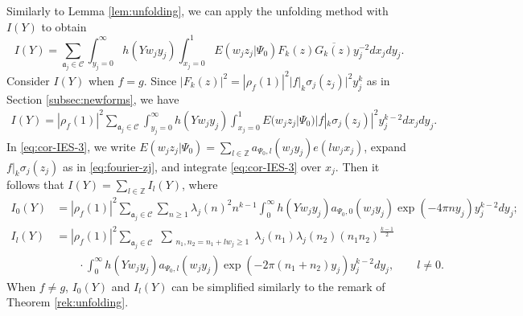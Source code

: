 \documentclass[12pt,reqno]{amsart}
\theoremstyle{remark}
\numberwithin{equation}{section}
\begin{document}
        Similarly to Lemma \ref{lem:unfolding}, we can apply the unfolding method with $I(Y)$ to obtain 
        \begin{equation}\label{eq:I(Y)-unfolding}
            I(Y) =
                \sum_{\mathfrak{a}_j \in \mathcal{C}} \int_{y_j=0}^{\infty} h(Yw_jy_j) \int_{x_j =0}^1 E(w_jz_j|\Psi_0) F_k(z)\overline{G_k(z)}y_j^{-2}dx_jdy_j.
        \end{equation}
        Consider $I(Y)$ when $f =g$. Since $|F_k(z)|^2 = |\rho_f(1)|^2|f|_k \sigma_j(z_j)|^2 y_j^k$ as in Section \ref{subsec:newforms}, we have
        \begin{equation}\label{eq:cor-IES-3}
			\begin{aligned}
				I(Y)
				= |\rho_f(1)|^2 \sum_{\mathfrak{a}_j \in \mathcal{C}} \int_{y_j=0}^{\infty} h(Yw_jy_j) \int_{x_j =0}^1 E(w_jz_j|\Psi_0) |f|_k \sigma_j(z_j)|^2 y_j^{k-2} dx_jdy_j.
			\end{aligned}
		\end{equation}	
        In \eqref{eq:cor-IES-3}, we write $E(w_jz_j|\Psi_0) = \sum_{l \in \mathbb{Z}} a_{\Psi_0, l}(w_jy_j)e(lw_jx_j)$, expand $f|_k \sigma_j(z_j)$ as in \eqref{eq:fourier-zj}, and integrate \eqref{eq:cor-IES-3} over $x_j$. Then it follows that $I(Y) = \sum_{l \in \mathbb{Z}} I_l(Y)$, where \begin{equation}\label{eq:I_l(y)}
        \begin{aligned}
			I_0(Y) &=  |\rho_f(1)|^2 \sum_{\mathfrak{a}_j \in \mathcal{C}} \sum_{n \ge 1} \lambda_j(n)^2n^{k-1} \int_{0}^{\infty} h(Yw_jy_j)a_{\Psi_0, 0}(w_jy_j) \exp(-4\pi n y_j)y_j^{k-2}dy_j;\\
			I_l(Y) &=  |\rho_f(1)|^2   \sum_{\mathfrak{a}_j \in \mathcal{C}}\,\,\sum_{\substack{n_1, n_2 = n_1+lw_j \ge 1}} \lambda_j(n_1)\lambda_j(n_2)(n_1n_2)^{\frac{k-1}{2}}\\
		&\qquad	\cdot \int_{0}^{\infty} h(Yw_jy_j) a_{\Psi_0, l}(w_jy_j) \exp(-2\pi(n_1+n_2)y_j)y_j^{k-2} dy_j, \qquad l \neq 0.
        \end{aligned}
        \end{equation}
        When $f \neq g$, $I_0(Y)$ and $I_l(Y)$ can be simplified similarly to the remark of Theorem \ref{rek:unfolding}.
  
\end{document}

